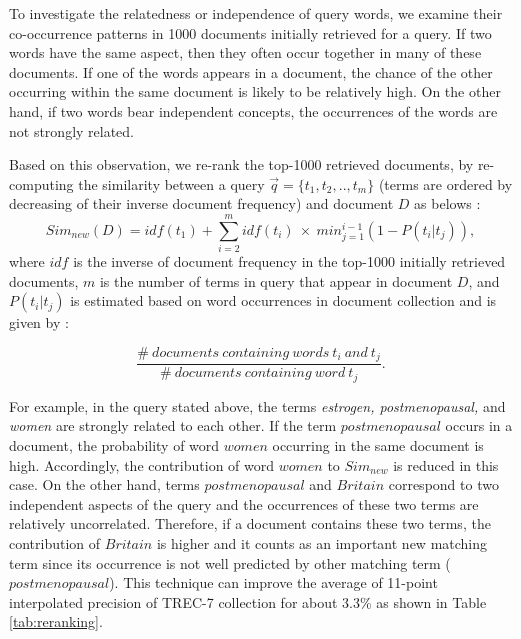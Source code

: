 To investigate the relatedness or independence of query words, we examine their co-occurrence patterns in 1000 documents initially retrieved for a query. If two words have the same aspect, then they often occur together in many of these documents. If one of the words appears in a document, the chance of the other occurring within the same document is likely to be relatively high. On the other hand, if two words bear independent concepts, the occurrences of the words are not  strongly related.

Based on this observation,  we re-rank the top-1000 retrieved documents, by re-computing the similarity between a query $\overrightarrow{q}=\{t_1,t_2,..,t_m\}$ (terms are ordered by decreasing of their inverse document frequency) and  document $D$  as belows \cite{mitra98} :
\[Sim_{new}(D) = idf(t_1) + \sum_{i=2}^m idf(t_i)~\times~ \displaystyle min_{j=1}^{i-1}(1-P(t_i|t_j)),\]
where $idf$ is the inverse of document frequency in the top-1000 initially retrieved documents, $m$ is the number of terms in query that appear in document $D$, and $P(t_i|t_j)$ is estimated based on word occurrences in document collection and is given by :

\[\frac{\#~documents~containing~words~t_i~and~t_j}{\#~documents~containing~word~t_j}. \]

For example, in the query stated above, the terms {\it estrogen, postmenopausal,} and {\it women} are strongly related to each other. If the term $postmenopausal$ occurs in a document, the probability of word $women$ occurring in the same document is high. Accordingly, the contribution of word $women$ to $Sim_{new}$ is reduced in this case. On the other hand, terms $postmenopausal$ and $Britain$ correspond to two independent aspects of the query and the occurrences of these two terms are relatively uncorrelated. Therefore, if a document contains these two terms, the contribution of $Britain$ is higher and it counts as an important new matching term since its occurrence is not well predicted by other matching term ($postmenopausal$).
This technique can improve the average of 11-point interpolated precision of TREC-7 collection for about 3.3\% as shown in Table \ref{tab:reranking}.

